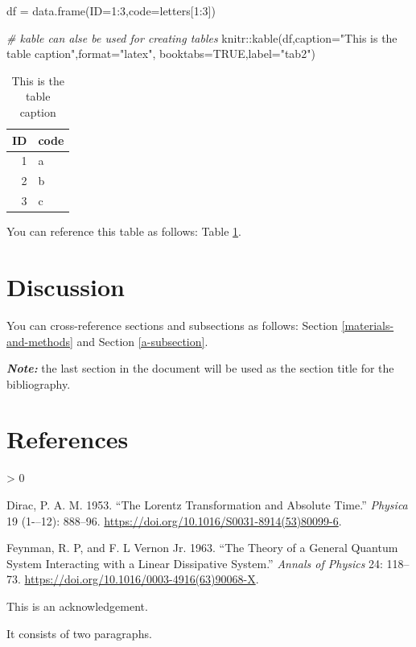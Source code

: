 \documentclass[12pt,halfline,a4paper,]{ouparticle}
\newenvironment{Shaded}{\begin{snugshade}}{\end{snugshade}}
\newcommand{\AttributeTok}[1]{\textcolor[rgb]{0.77,0.63,0.00}{#1}}
\newcommand{\CommentTok}[1]{\textcolor[rgb]{0.56,0.35,0.01}{\textit{#1}}}
\newcommand{\ConstantTok}[1]{\textcolor[rgb]{0.00,0.00,0.00}{#1}}
\newcommand{\DecValTok}[1]{\textcolor[rgb]{0.00,0.00,0.81}{#1}}
\newcommand{\FunctionTok}[1]{\textcolor[rgb]{0.00,0.00,0.00}{#1}}
\newcommand{\NormalTok}[1]{#1}
\newcommand{\OtherTok}[1]{\textcolor[rgb]{0.56,0.35,0.01}{#1}}
\newcommand{\SpecialCharTok}[1]{\textcolor[rgb]{0.00,0.00,0.00}{#1}}
\newcommand{\StringTok}[1]{\textcolor[rgb]{0.31,0.60,0.02}{#1}}
\newlength{\cslhangindent}
\newenvironment{CSLReferences}[2] %
 {%
  \setlength{\parindent}{0pt}
  \ifodd #1 \everypar{\setlength{\hangindent}{\cslhangindent}}\ignorespaces\fi
  \ifnum #2 > 0
  \setlength{\parskip}{#2\baselineskip}
  \fi
 }%
 {}
\begin{document}
\begin{Shaded}
\begin{Highlighting}[]
\NormalTok{df }\OtherTok{=} \FunctionTok{data.frame}\NormalTok{(}\AttributeTok{ID=}\DecValTok{1}\SpecialCharTok{:}\DecValTok{3}\NormalTok{,}\AttributeTok{code=}\NormalTok{letters[}\DecValTok{1}\SpecialCharTok{:}\DecValTok{3}\NormalTok{])}

\CommentTok{\# kable can alse be used for creating tables}
\NormalTok{knitr}\SpecialCharTok{::}\FunctionTok{kable}\NormalTok{(df,}\AttributeTok{caption=}\StringTok{"This is the table caption"}\NormalTok{,}\AttributeTok{format=}\StringTok{"latex"}\NormalTok{,}
             \AttributeTok{booktabs=}\ConstantTok{TRUE}\NormalTok{,}\AttributeTok{label=}\StringTok{"tab2"}\NormalTok{)}
\end{Highlighting}
\end{Shaded}

\begin{table}

\caption{\label{tab:tab2}This is the table caption}
\centering
\begin{tabular}[t]{rl}
\toprule
ID & code\\
\midrule
1 & a\\
2 & b\\
3 & c\\
\bottomrule
\end{tabular}
\end{table}

You can reference this table as follows: Table \ref{tab:tab2}.

\hypertarget{discussion}{%
\section{Discussion}\label{discussion}}

You can cross-reference sections and subsections as follows: Section
\ref{materials-and-methods} and Section \ref{a-subsection}.

\textbf{\emph{Note:}} the last section in the document will be used as
the section title for the bibliography.

\hypertarget{references}{%
\section*{References}\label{references}}

\hypertarget{refs}{}
\begin{CSLReferences}{1}{0}
\leavevmode\hypertarget{ref-Dirac1953888}{}%
Dirac, P. A. M. 1953. {``The Lorentz Transformation and Absolute
Time.''} \emph{Physica} 19 (1-\/--12): 888--96.
\url{https://doi.org/10.1016/S0031-8914(53)80099-6}.

\leavevmode\hypertarget{ref-Feynman1963118}{}%
Feynman, R. P, and F. L Vernon Jr. 1963. {``The Theory of a General
Quantum System Interacting with a Linear Dissipative System.''}
\emph{Annals of Physics} 24: 118--73.
\url{https://doi.org/10.1016/0003-4916(63)90068-X}.

\end{CSLReferences}


\begin{notes}[Acknowledgements]
This is an acknowledgement.

It consists of two paragraphs.
\end{notes}
\end{document}
